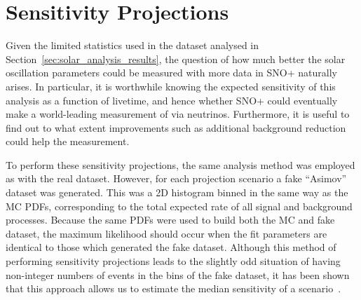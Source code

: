 
    
\section{Sensitivity Projections}\label{sec:solar_projections}
Given the limited statistics used in the dataset analysed in Section~\ref{sec:solar_analysis_results}, the question of how much better the solar oscillation parameters could be measured with more data in SNO+ naturally arises. In particular, it is worthwhile knowing the expected sensitivity of this analysis as a function of livetime, and hence whether SNO+ could eventually make a world-leading measurement of \tonetwo{} via \beight{} neutrinos. Furthermore, it is useful to find out to what extent improvements such as additional background reduction could help the measurement.

To perform these sensitivity projections, the same analysis method was employed as with the real dataset. However, for each projection scenario a fake ``Asimov'' dataset was generated. This was a 2D histogram binned in the same way as the MC PDFs, corresponding to the total expected rate of all signal and background processes. Because the same PDFs were used to build both the MC and fake dataset, the maximum likelihood should occur when the fit parameters are identical to those which generated the fake dataset. Although this method of performing sensitivity projections leads to the slightly odd situation of having non-integer numbers of events in the bins of the fake dataset, it has been shown that this approach allows us to estimate the median sensitivity of a scenario~\cite{cowanAsymptoticFormulaeLikelihoodbased2011}. %

